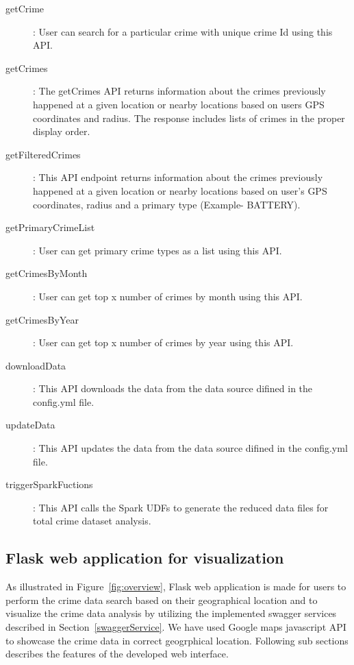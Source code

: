 \begin{description}
	\item[getCrime]: User can search for a particular crime with unique crime Id using this API.
	\item[getCrimes]: The getCrimes API returns information about the crimes previously happened at a given location or nearby locations based on users GPS coordinates and radius. The response includes lists of crimes in the proper display order.
	\item[getFilteredCrimes]: This API endpoint returns information about the crimes previously happened at a given location or nearby locations based on user’s GPS coordinates, radius and a primary type (Example- BATTERY).
	\item[getPrimaryCrimeList]: User can get primary crime types as a list using this API.
	\item[getCrimesByMonth]: User can get top x number of crimes by month using this API.
	\item[getCrimesByYear]: User can get top x number of crimes by year using this API.
	\item[downloadData]: This API downloads the data from the data source difined in the config.yml file.
	\item[updateData]: This API updates the data from the data source difined in the config.yml file.
	\item[triggerSparkFuctions]: This API calls the Spark UDFs to generate the reduced data files for total crime dataset analysis.
\end{description}

\subsection{Flask web application for visualization}\label{flaskWebApp}
As illustrated in Figure~\ref{fig:overview}, Flask web application is
made for users to perform the crime data search based on their
geographical location and to visualize the crime data analysis by
utilizing the implemented swagger services described in
Section~\ref{swaggerService}. We have used Google maps javascript API
to showcase the crime data in correct geogrphical location. Following
sub sections describes the features of the developed web interface.


